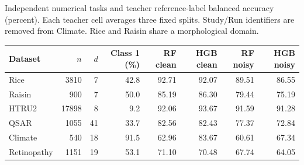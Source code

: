 \begin{kbtable}
\centering
\caption{Independent numerical tasks and teacher reference-label balanced accuracy (percent). Each teacher cell averages three fixed splits. Study/Run identifiers are removed from Climate. Rice and Raisin share a morphological domain.}
\label{tab:independent-data}
\small
\begin{adjustbox}{max width=\linewidth}
\begin{tabular}{lrrrrrrr}
\toprule
Dataset & $n$ & $d$ & Class 1 (\%) & RF clean & HGB clean & RF noisy & HGB noisy \\
\midrule
Rice & 3810 & 7 & 42.8 & 92.71 & 92.07 & 89.51 & 86.55 \\
Raisin & 900 & 7 & 50.0 & 85.19 & 86.30 & 79.44 & 75.19 \\
HTRU2 & 17898 & 8 & 9.2 & 92.06 & 93.67 & 91.59 & 91.28 \\
QSAR & 1055 & 41 & 33.7 & 82.56 & 82.43 & 77.37 & 72.84 \\
Climate & 540 & 18 & 91.5 & 62.96 & 83.67 & 60.61 & 67.34 \\
Retinopathy & 1151 & 19 & 53.1 & 71.10 & 70.48 & 67.74 & 64.05 \\
\bottomrule
\end{tabular}
\end{adjustbox}
\end{kbtable}
